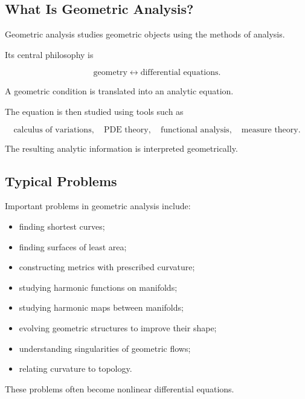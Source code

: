 \subsection{What Is Geometric Analysis?}
\label{subsec:what-is-geometric-analysis}

Geometric analysis studies geometric objects using the methods of
analysis.

Its central philosophy is

\[
\boxed{
\text{geometry}
\longleftrightarrow
\text{differential equations}.
}
\]

A geometric condition is translated into an analytic equation.

The equation is then studied using tools such as

\[
\boxed{
\text{calculus of variations},
\quad
\text{PDE theory},
\quad
\text{functional analysis},
\quad
\text{measure theory}.
}
\]

The resulting analytic information is interpreted geometrically.

\subsection{Typical Problems}
\label{subsec:geometric-analysis-problems}

Important problems in geometric analysis include:

\begin{itemize}
    \item finding shortest curves;
    \item finding surfaces of least area;
    \item constructing metrics with prescribed curvature;
    \item studying harmonic functions on manifolds;
    \item studying harmonic maps between manifolds;
    \item evolving geometric structures to improve their shape;
    \item understanding singularities of geometric flows;
    \item relating curvature to topology.
\end{itemize}

These problems often become nonlinear differential equations.

